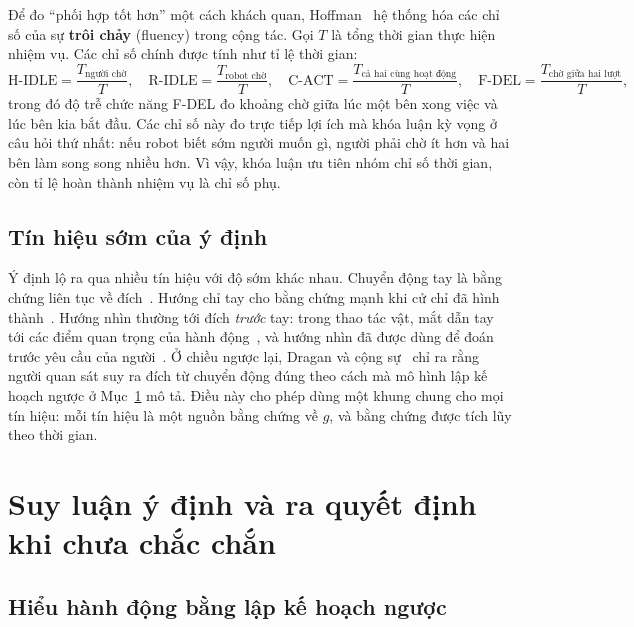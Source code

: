 Để đo ``phối hợp tốt hơn'' một cách khách quan, Hoffman~\cite{hoffman2019fluency} hệ thống hóa các chỉ số của sự \textbf{trôi chảy} (fluency) trong cộng tác. Gọi $T$ là tổng thời gian thực hiện nhiệm vụ. Các chỉ số chính được tính như tỉ lệ thời gian:
\begin{equation}
  \text{H-IDLE}=\frac{T_{\text{người chờ}}}{T},\quad
  \text{R-IDLE}=\frac{T_{\text{robot chờ}}}{T},\quad
  \text{C-ACT}=\frac{T_{\text{cả hai cùng hoạt động}}}{T},\quad
  \text{F-DEL}=\frac{T_{\text{chờ giữa hai lượt}}}{T},
  \label{eq:fluency}
\end{equation}
trong đó độ trễ chức năng F-DEL đo khoảng chờ giữa lúc một bên xong việc và lúc bên kia bắt đầu. Các chỉ số này đo trực tiếp lợi ích mà khóa luận kỳ vọng ở câu hỏi thứ nhất: nếu robot biết sớm người muốn gì, người phải chờ ít hơn và hai bên làm song song nhiều hơn. Vì vậy, khóa luận ưu tiên nhóm chỉ số thời gian, còn tỉ lệ hoàn thành nhiệm vụ là chỉ số phụ.

\subsection{Tín hiệu sớm của ý định}

Ý định lộ ra qua nhiều tín hiệu với độ sớm khác nhau. Chuyển động tay là bằng chứng liên tục về đích~\cite{perezdarpino2015fast}. Hướng chỉ tay cho bằng chứng mạnh khi cử chỉ đã hình thành~\cite{nickel2007pointing,nakamura2023deepoint}. Hướng nhìn thường tới đích \emph{trước} tay: trong thao tác vật, mắt dẫn tay tới các điểm quan trọng của hành động~\cite{johansson2001eyehand}, và hướng nhìn đã được dùng để đoán trước yêu cầu của người~\cite{huang2016anticipatory}. Ở chiều ngược lại, Dragan và cộng sự~\cite{dragan2013legibility} chỉ ra rằng người quan sát suy ra đích từ chuyển động đúng theo cách mà mô hình lập kế hoạch ngược ở Mục~\ref{sec:bg-bayes} mô tả. Điều này cho phép dùng một khung chung cho mọi tín hiệu: mỗi tín hiệu là một nguồn bằng chứng về $g$, và bằng chứng được tích lũy theo thời gian.

\section{Suy luận ý định và ra quyết định khi chưa chắc chắn}
\label{sec:bg-bayes}

\subsection{Hiểu hành động bằng lập kế hoạch ngược}

